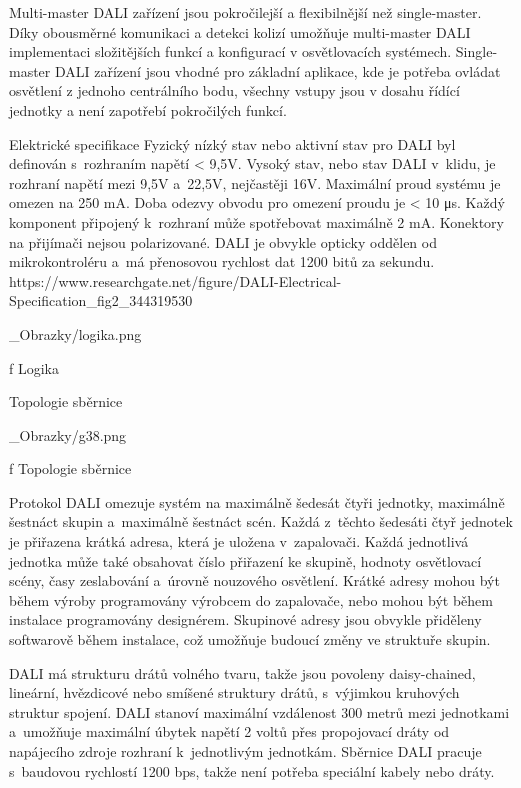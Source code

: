 Multi-master DALI zařízení jsou pokročilejší a flexibilnější než single-master.
Díky obousměrné komunikaci a detekci kolizí umožňuje multi-master DALI implementaci
složitějších funkcí a konfigurací v osvětlovacích systémech. Single-master DALI zařízení
jsou vhodné pro základní aplikace, kde je potřeba ovládat osvětlení z jednoho centrálního
bodu, všechny vstupy jsou v dosahu řídící jednotky a není zapotřebí pokročilých funkcí.



\sec Elektrické specifikace
Fyzický nízký stav nebo aktivní stav pro DALI byl definován s~rozhraním napětí < 9,5V. Vysoký stav, nebo stav
DALI v~klidu, je rozhraní napětí mezi 9,5V a~22,5V, nejčastěji 16V. Maximální proud systému je omezen na 250 mA.
Doba odezvy obvodu pro omezení proudu je < 10 μs. Každý komponent připojený k~rozhraní může spotřebovat maximálně 2 mA.
Konektory na přijímači nejsou polarizované. DALI je obvykle opticky oddělen od mikrokontroléru a~má přenosovou
rychlost dat 1200 bitů za sekundu.
\medskip
https://www.researchgate.net/figure/DALI-Electrical-Specification_fig2_344319530
\medskip


\medskip {}
\picw=8cm _Obrazky/logika.png
\caption/f Logika
\medskip

\sec Topologie sběrnice

\medskip {}
\picw=8cm _Obrazky/g38.png
\caption/f Topologie sběrnice
\medskip

Protokol DALI omezuje systém na maximálně šedesát čtyři jednotky, maximálně šestnáct skupin a~maximálně šestnáct scén.
Každá z~těchto šedesáti čtyř jednotek je přiřazena krátká adresa, která je uložena v~zapalovači.
Každá jednotlivá jednotka může také obsahovat číslo přiřazení ke skupině, hodnoty osvětlovací scény,
časy zeslabování a~úrovně nouzového osvětlení. Krátké adresy mohou být během výroby programovány výrobcem
do zapalovače, nebo mohou být během instalace programovány designérem. Skupinové adresy jsou obvykle
přiděleny softwarově během instalace, což umožňuje budoucí změny ve struktuře skupin.

DALI má strukturu drátů volného tvaru, takže jsou povoleny daisy-chained, lineární, hvězdicové nebo smíšené
struktury drátů, s~výjimkou kruhových struktur spojení. DALI stanoví maximální vzdálenost 300 metrů mezi
jednotkami a~umožňuje maximální úbytek napětí 2 voltů přes propojovací dráty od napájecího zdroje rozhraní
k~jednotlivým jednotkám. Sběrnice DALI pracuje s~baudovou rychlostí 1200 bps, takže není potřeba speciální
kabely nebo dráty.

